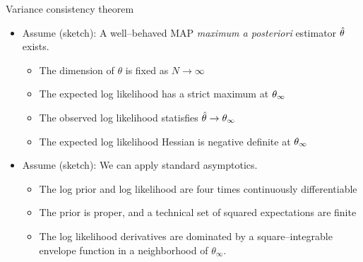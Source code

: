 \begin{frame}[t]{Variance consistency theorem}
\pause
%
\begin{itemize}
    \item Assume (sketch): A well--behaved MAP \textit{maximum a posteriori} estimator $\hat\theta$ exists.
    \begin{itemize}
        \item The dimension of $\theta$ is fixed as $N \rightarrow \infty$
        \item The expected log likelihood has a strict maximum at $\theta_{\infty}$
        \item The observed log likelihood statisfies $\hat\theta \rightarrow \theta_{\infty}$
        \item The expected log likelihood Hessian is negative definite at $\theta_{\infty}$ 
    \end{itemize}
    \item Assume (sketch): We can apply standard asymptotics.
    \begin{itemize}
    \item The log prior and log likelihood are four times continuously differentiable
    \item The prior is proper, and a technical set of squared expectations are finite
    \item The log likelihood derivatives are dominated by a square--integrable envelope function in a
          neighborhood of $\theta_\infty$.
    \end{itemize}
\end{itemize}
%
\pause



\end{frame}








